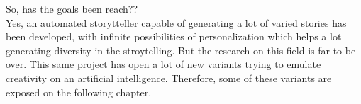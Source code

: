 So, has the goals been reach??\\
Yes, an automated storytteller capable of generating a lot of varied stories has been developed, with infinite possibilities of personalization which helps a lot generating diversity in the stroytelling.
But the research on this field is far to be over. This same project has open a lot of new variants trying to emulate creativity on an artificial intelligence. Therefore, some of these variants are exposed on the following chapter.




